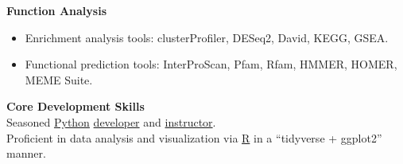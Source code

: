\textbf{Function Analysis}
\begin{itemize}
    \item Enrichment analysis tools: clusterProfiler, DESeq2, David, KEGG, GSEA.
    \item Functional prediction tools: InterProScan, Pfam, Rfam, HMMER, HOMER, MEME Suite.
\end{itemize}


\textbf{Core Development Skills}\\

Seasoned \underline{Python} \href{https://github.com/hermanzhaozzzz}{developer} 
and \href{https://www.bioinfo.info/p/t_pc/goods_pc_detail/goods_detail/course_2SvfNlIVzrKfOcexHk9Nute5Bhd}{instructor}.\\
Proficient in data analysis and visualization via \underline{R} in a ``tidyverse + ggplot2'' manner.
